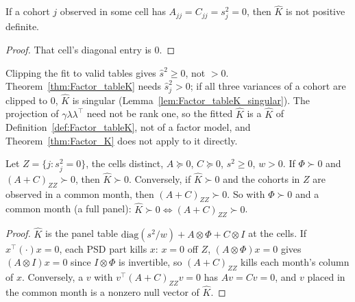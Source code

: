 \begin{lemma}\label{lem:Factor_tableK_singular}
  \leanok
  If a cohort $j$ observed in some cell has $A_{jj} = C_{jj} = s_j^2 = 0$, then $\hat K$ is
  not positive definite.
\end{lemma}
\begin{proof}
  \leanok
  That cell's diagonal entry is $0$.
\end{proof}

\begin{remark}[Finding 30]
  Clipping the fit to valid tables gives $\hat s^2 \ge 0$, not $> 0$. Theorem~\ref{thm:Factor_tableK}
  needs $\hat s_j^2 > 0$; if all three variances of a cohort are clipped to $0$, $\hat K$ is
  singular (Lemma~\ref{lem:Factor_tableK_singular}). The projection of $\gamma\lambda\lambda^\top$
  need not be rank one, so the fitted $\hat K$ is a $\hat K$ of Definition~\ref{def:Factor_tableK},
  not of a factor model, and Theorem~\ref{thm:Factor_K} does not apply to it directly.
\end{remark}

\begin{theorem}[Valid tables with some $\hat s_j^2 = 0$]\label{thm:Factor_tableK_iff}
  \leanok
  Let $Z = \{j : s_j^2 = 0\}$, the cells distinct, $A \succeq 0$, $C \succeq 0$, $s^2 \ge 0$,
  $w > 0$. If $\Phi \succ 0$ and $(A + C)_{ZZ} \succ 0$, then $\hat K \succ 0$. Conversely, if
  $\hat K \succ 0$ and the cohorts in $Z$ are observed in a common month, then
  $(A + C)_{ZZ} \succ 0$. So with $\Phi \succ 0$ and a common month (a full panel):
  $\hat K \succ 0 \iff (A + C)_{ZZ} \succ 0$.
\end{theorem}
\begin{proof}
  \leanok
  $\hat K$ is the panel table $\mathrm{diag}(s^2/w) + A \otimes \Phi + C \otimes I$ at the cells.
  If $x^\top(\cdot)x = 0$, each PSD part kills $x$: $x = 0$ off $Z$, $(A \otimes \Phi)x = 0$ gives
  $(A \otimes I)x = 0$ since $I \otimes \Phi$ is invertible, so $(A + C)_{ZZ}$ kills each month's
  column of $x$. Conversely, a $v$ with $v^\top(A + C)_{ZZ}v = 0$ has $Av = Cv = 0$, and $v$ placed
  in the common month is a nonzero null vector of $\hat K$.
\end{proof}

